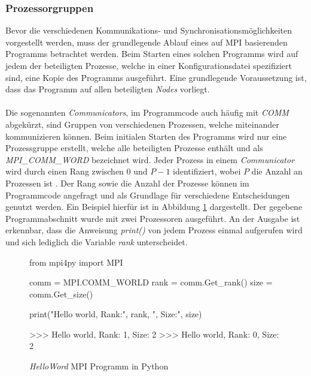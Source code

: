\subsubsection{Prozessorgruppen}
Bevor die verschiedenen Kommunikations- und Synchronisationsmöglichkeiten vorgestellt werden, muss der grundlegende Ablauf eines auf \ac{MPI} basierenden Programms betrachtet werden. Beim Starten eines solchen Programms wird auf jedem der beteiligten Prozesse, welche in einer Konfigurationsdatei spezifiziert sind, eine Kopie des Programms ausgeführt. Eine grundlegende Voraussetzung ist, dass das Programm auf allen beteiligten \emph{Nodes} vorliegt. 
\\\\
Die sogenannten \emph{Communicators}, im Programmcode auch häufig mit \emph{COMM} abgekürzt, sind Gruppen von verschiedenen Prozessen, welche miteinander kommunizieren können. Beim initialen Starten des Programms wird nur eine Prozessgruppe erstellt, welche alle beteiligten Prozesse enthält und als \emph{MPI\_COMM\_WORD} bezeichnet wird. Jeder Prozess in einem \emph{Communicator} wird  durch einen Rang zwischen $0$ und $P-1$ identifiziert, wobei $P$ die Anzahl an Prozessen ist \cite{nielsen2016introduction}. Der Rang sowie die Anzahl der Prozesse können im Programmcode angefragt und als Grundlage für verschiedene Entscheidungen genutzt werden. Ein Beispiel hierfür ist in Abbildung \ref{fig:example_process_group} dargestellt. Der gegebene Programmabschnitt wurde mit zwei Prozessoren ausgeführt. An der Ausgabe ist erkennbar, dass die Anweisung \emph{print()} von jedem Prozess einmal aufgerufen wird und sich lediglich die Variable \emph{rank} unterscheidet. 
\begin{figure}
	
	\begin{python}
		from mpi4py import MPI
		
		comm = MPI.COMM_WORLD
		rank = comm.Get_rank()
		size = comm.Get_size()
		
		print("Hello world, Rank:", rank, ", Size:", size)
		
		>>> Hello world, Rank: 1, Size: 2
		>>> Hello world, Rank: 0, Size: 2
	\end{python}
	\caption{\emph{HelloWord} MPI Programm in Python}
	\label{fig:example_process_group}
\end{figure}



